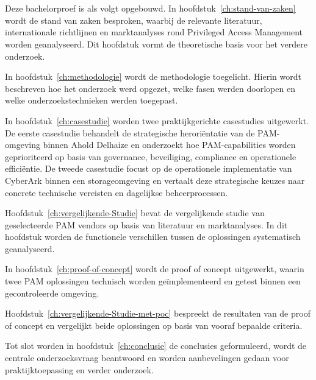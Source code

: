 \section{}%
\label{sec:opzet-bachelorproef}


Deze bachelorproef is als volgt opgebouwd. 
In hoofdstuk~\ref{ch:stand-van-zaken}  wordt de stand van zaken besproken, waarbij de relevante literatuur, internationale richtlijnen en marktanalyses rond Privileged Access Management worden geanalyseerd. Dit hoofdstuk vormt de theoretische basis voor het verdere onderzoek.


In hoofdstuk~\ref{ch:methodologie} wordt de methodologie toegelicht. Hierin wordt beschreven hoe het onderzoek werd opgezet, welke fasen werden doorlopen en welke onderzoekstechnieken werden toegepast.

In hoofdstuk~\ref{ch:casestudie} worden twee praktijkgerichte casestudies uitgewerkt. De eerste casestudie behandelt de strategische heroriëntatie van de PAM-omgeving binnen Ahold Delhaize en onderzoekt hoe PAM-capabilities worden geprioriteerd op basis van governance, beveiliging, compliance en operationele efficiëntie. De tweede casestudie focust op de operationele implementatie van CyberArk binnen een storageomgeving en vertaalt deze strategische keuzes naar concrete technische vereisten en dagelijkse beheerprocessen.

Hoofdstuk~\ref{ch:vergelijkende-Studie} bevat de vergelijkende studie van geselecteerde PAM vendors op basis van literatuur en marktanalyses. In dit hoofdstuk worden de functionele verschillen tussen de oplossingen systematisch geanalyseerd.


In hoofdstuk~\ref{ch:proof-of-concept} wordt de proof of concept uitgewerkt, waarin twee PAM oplossingen technisch worden geïmplementeerd en getest binnen een gecontroleerde omgeving.


Hoofdstuk~\ref{ch:vergelijkende-Studie-met-poc} bespreekt de resultaten van de proof of concept en vergelijkt beide oplossingen op basis van vooraf bepaalde criteria.

Tot slot worden in hoofdstuk~\ref{ch:conclusie} de conclusies geformuleerd, wordt de centrale onderzoeksvraag beantwoord en worden aanbevelingen gedaan voor praktijktoepassing en verder onderzoek.
